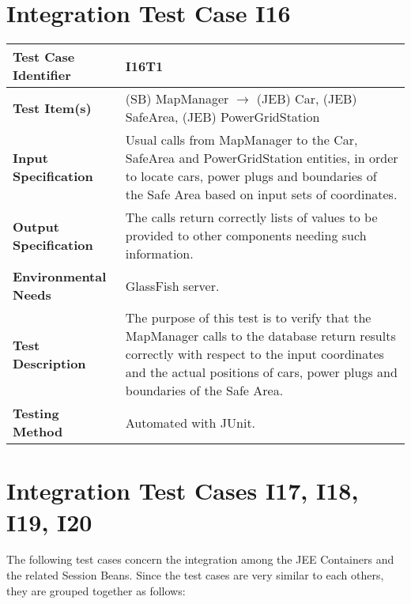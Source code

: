 \section{Integration Test Case I16}

\begin{longtable}{p{} | p{}}
\hline
\textbf{Test Case Identifier} & I16T1\\
\hline
\textbf{Test Item(s)} & (SB) MapManager $\rightarrow$ (JEB) Car, (JEB) SafeArea, (JEB) PowerGridStation \\
\hline
\textbf{Input Specification} & Usual calls from MapManager to the Car, SafeArea and PowerGridStation entities, in order to locate cars, power plugs and boundaries of the Safe Area based on input sets of coordinates. \\
\hline
\textbf{Output Specification} & The calls return correctly lists of values to be provided to other components needing such information. \\
\hline
\textbf{Environmental Needs} & GlassFish server. \\
\hline
\textbf{Test Description} & The purpose of this test is to verify that the MapManager calls to the database return results correctly with respect to the input coordinates and the actual positions of cars, power plugs and boundaries of the Safe Area. \\
\hline
\textbf{Testing Method} & Automated with JUnit. \\
\hline
\end{longtable}

\section{Integration Test Cases I17, I18, I19, I20}

The following test cases concern the integration among the JEE Containers and the related Session Beans. Since the test cases are very similar to each others, they are grouped together as follows:

